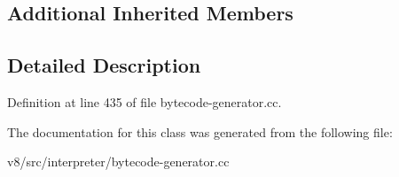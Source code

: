 \subsection*{Additional Inherited Members}


\subsection{Detailed Description}


Definition at line 435 of file bytecode-\/generator.\+cc.



The documentation for this class was generated from the following file\+:\begin{DoxyCompactItemize}
\item 
v8/src/interpreter/bytecode-\/generator.\+cc\end{DoxyCompactItemize}
